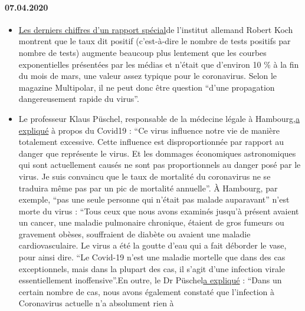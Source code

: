 \hypertarget{07042020}{%
\paragraph{07.04.2020}\label{07042020}}

\begin{itemize}
\tightlist
\item
  \href{https://multipolar-magazin.de/artikel/coronavirus-regierung-ignoriert-daten}{Les
  derniers chiffres d'un rapport spécial}de l'institut allemand Robert
  Koch montrent que le taux dit positif (c'est-à-dire le nombre de tests
  positifs par nombre de tests) augmente beaucoup plus lentement que les
  courbes exponentielles présentées par les médias et n'était que
  d'environ 10 \% à la fin du mois de mars, une valeur assez typique
  pour le coronavirus. Selon le magazine Multipolar, il ne peut donc
  être question ``d'une propagation dangereusement rapide du virus''.
\item
  Le professeur Klaus Püschel, responsable de la médecine légale à
  Hambourg,\href{https://www.pressreader.com/germany/hamburger-morgenpost/20200403/281487868456736}{a
  expliqué} à propos du Covid19 : ``Ce virus influence notre vie de
  manière totalement excessive. Cette influence est disproportionnée par
  rapport au danger que représente le virus. Et les dommages économiques
  astronomiques qui sont actuellement causés ne sont pas proportionnels
  au danger posé par le virus. Je suis convaincu que le taux de
  mortalité du coronavirus ne se traduira même pas par un pic de
  mortalité annuelle''. À Hambourg, par exemple, ``pas une seule
  personne qui n'était pas malade auparavant'' n'est morte du virus :
  ``Tous ceux que nous avons examinés jusqu'à présent avaient un cancer,
  une maladie pulmonaire chronique, étaient de gros fumeurs ou gravement
  obèses, souffraient de diabète ou avaient une maladie
  cardiovasculaire. Le virus a été la goutte d'eau qui a fait déborder
  le vase, pour ainsi dire. ``Le Covid-19 n'est une maladie mortelle que
  dans des cas exceptionnels, mais dans la plupart des cas, il s'agit
  d'une infection virale essentiellement inoffensive''.En outre, le Dr
  Püschel\href{https://www.abendblatt.de/hamburg/article228828787/rechtsmedizin-pueschel-hamburg-corona-virus-infektion-covid-19-coronavirus-krise-patienten-krankenhaeuser-kliniken-infektionsrate-krankheit-pandemie-test-lungenkrankheit-sars-cov-epidemie-sars-cov-2.html}{a
  expliqué} : ``Dans un certain nombre de cas, nous avons également
  constaté que l'infection à Coronavirus actuelle n'a absolument rien à

\end{itemize}
